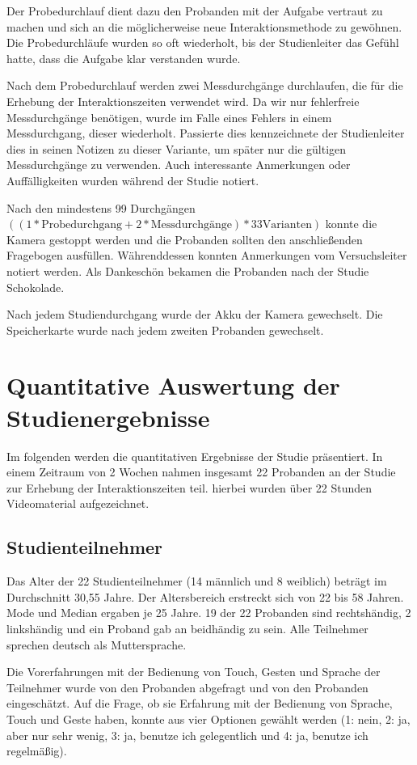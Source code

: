 Der Probedurchlauf dient dazu den Probanden mit der Aufgabe vertraut zu machen und sich an die möglicherweise neue Interaktionsmethode zu gewöhnen.
Die Probedurchläufe wurden so oft wiederholt, bis der Studienleiter das Gefühl hatte, dass die Aufgabe klar verstanden wurde. 

Nach dem Probedurchlauf werden zwei Messdurchgänge durchlaufen, die für die Erhebung der Interaktionszeiten verwendet wird.
Da wir nur fehlerfreie Messdurchgänge benötigen, wurde im Falle eines Fehlers in einem Messdurchgang, dieser wiederholt.
Passierte dies kennzeichnete der Studienleiter dies in seinen Notizen zu dieser Variante, um später nur die gültigen Messdurchgänge zu verwenden.
Auch interessante Anmerkungen oder Auffälligkeiten wurden während der Studie notiert.

Nach den mindestens 99 Durchgängen $((1 * \text{Probedurchgang} + 2 * \text{Messdurchgänge}) * 33 \text{Varianten})$ konnte die Kamera gestoppt werden und die Probanden sollten den anschließenden Fragebogen ausfüllen.
Währenddessen konnten Anmerkungen vom Versuchsleiter notiert werden. 
Als Dankeschön bekamen die Probanden nach der Studie Schokolade.

Nach jedem Studiendurchgang wurde der Akku der Kamera gewechselt. Die Speicherkarte wurde nach jedem zweiten Probanden gewechselt.
\section[Quantitative Auswertung]{Quantitative Auswertung der Studienergebnisse}
Im folgenden werden die quantitativen Ergebnisse der Studie präsentiert.
In einem Zeitraum von 2 Wochen nahmen insgesamt 22 Probanden an der Studie zur Erhebung der Interaktionszeiten teil.
hierbei wurden über 22 Stunden Videomaterial aufgezeichnet. 
\subsection[Studienteilnehmer]{Studienteilnehmer}
Das Alter der 22 Studienteilnehmer (14 männlich und 8 weiblich) beträgt im Durchschnitt 30,55 Jahre. 
Der Altersbereich erstreckt sich von 22 bis 58 Jahren. 
Mode und Median ergaben je 25 Jahre. 19 der 22 Probanden sind rechtshändig, 2 linkshändig und ein Proband gab an beidhändig zu sein. 
Alle Teilnehmer sprechen deutsch als Muttersprache.

Die Vorerfahrungen mit der Bedienung von Touch, Gesten und Sprache der Teilnehmer wurde von den Probanden abgefragt und von den Probanden eingeschätzt. 
Auf die Frage, ob sie Erfahrung mit der Bedienung von Sprache, Touch und Geste haben, konnte aus vier Optionen gewählt werden (1: nein, 2: ja, aber nur sehr wenig, 3: ja, benutze ich gelegentlich und 4: ja, benutze ich regelmäßig). 

